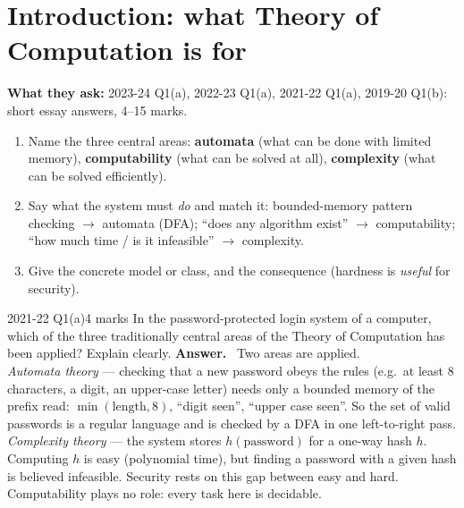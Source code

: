 \documentclass[10.5pt,a4paper]{article}
\newcommand{\asked}[1]{{\small\color{gray!60!black}\textbf{What they ask:} #1}\par}
\newcommand{\ansh}[1]{\textbf{\color{exborder}#1}\ }
\begin{document}
\section{Introduction: what Theory of Computation is for}
\asked{2023-24 Q1(a), 2022-23 Q1(a), 2021-22 Q1(a), 2019-20 Q1(b): short essay answers, 4--15 marks.}
\begin{recipe}
\begin{enumerate}
\item Name the three central areas: \textbf{automata} (what can be done with limited memory), \textbf{computability} (what can be solved at
all), \textbf{complexity} (what can be solved efficiently).
\item Say what the system must \emph{do} and match it: bounded-memory pattern checking $\to$ automata (DFA); ``does any algorithm exist''
$\to$ computability; ``how much time / is it infeasible'' $\to$ complexity.
\item Give the concrete model or class, and the consequence (hardness is \emph{useful} for security).
\end{enumerate}
\end{recipe}

\begin{examq}{2021-22 Q1(a)}{4 marks}
In the password-protected login system of a computer, which of the three traditionally central areas of the Theory of Computation has been
applied? Explain clearly.
\tcblower
\ansh{Answer.} Two areas are applied.\\
\emph{Automata theory} --- checking that a new password obeys the rules (e.g.\ at least 8 characters, a digit, an upper-case letter) needs only
a bounded memory of the prefix read: $\min(\text{length},8)$, ``digit seen'', ``upper case seen''. So the set of valid passwords is a regular
language and is checked by a DFA in one left-to-right pass.\\
\emph{Complexity theory} --- the system stores $h(\text{password})$ for a one-way hash $h$. Computing $h$ is easy (polynomial time), but finding
a password with a given hash is believed infeasible. Security rests on this gap between easy and hard.\\
Computability plays no role: every task here is decidable.
\end{examq}
\end{document}
